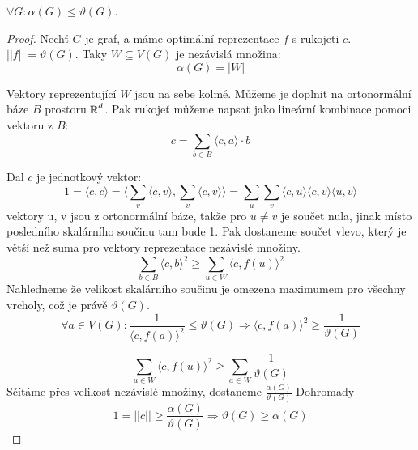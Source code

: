 \begin{lemma}
	$\forall G : \alpha(G) \leq \vartheta(G)$.
\end{lemma}
\begin{proof}
	Nechť $G$ je graf, a máme optimální reprezentace $f$ s rukojeti $c$. $|| f || = \vartheta(G)$.
	Taky $W \subseteq V(G)$ je nezávislá množina:
	\[ \alpha(G) = |W| \]

	Vektory reprezentující $W$ jsou na sebe kolmé. Můžeme je doplnit na ortonormální báze $B$ prostoru $\operatorname{\mathbb{R}}^d$.
	Pak rukojeť můžeme napsat jako lineární kombinace pomoci vektoru z $B$:
	\[ c = \sum_{b \in B} \langle c, a \rangle \cdot b \]

	Dal $c$ je jednotkový vektor:
	\[ 1 = \langle c, c \rangle = \langle \sum_v \langle c,v \rangle, \sum_v \langle c,v \rangle \rangle = \sum_u \sum_v \langle c,u \rangle \langle c, v \rangle \langle u, v \rangle \]
	vektory u, v jsou z ortonormální báze, takže pro $u \ne v$ je součet nula, jinak místo posledního skalárního součinu tam bude 1. Pak dostaneme součet vlevo, který je větší než suma pro vektory reprezentace nezávislé množiny.
	\[ \sum_{b \in B} \langle c, b \rangle^2 \geq \sum_{u \in W} \langle c, f(u) \rangle^2 \]
	Nahledneme že velikost skalárního součinu je omezena maximumem pro všechny vrcholy, což je právě $\vartheta(G)$.
	\[ \forall a \in V(G): \frac{1}{\langle c, f(a) \rangle^2} \leq \vartheta(G) \Rightarrow \langle c, f(a) \rangle^2 \geq \frac{1}{\vartheta(G)} \]

	\[ \sum_{u \in W} \langle c, f(u) \rangle^2 \geq \sum_{a \in W} \frac{1}{\vartheta(G)} \]
	Sčítáme přes velikost nezávislé množiny, dostaneme $ \frac{\alpha(G)}{\vartheta(G)} $
	Dohromady
	\[ 1 = || c || \geq \frac{\alpha(G)}{\vartheta(G)} \Rightarrow \vartheta(G) \geq \alpha(G) \]
\end{proof}

